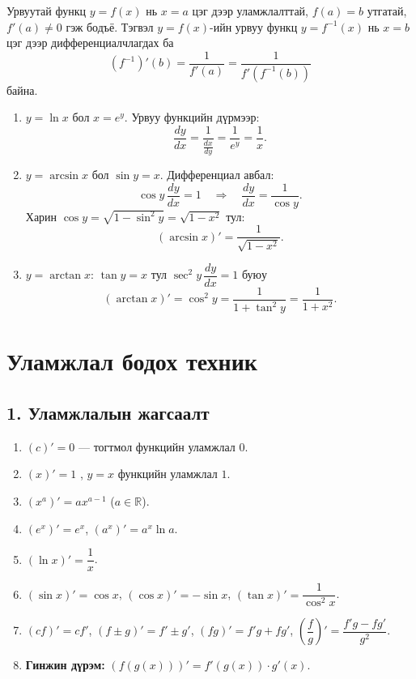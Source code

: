 \begin{theorem}
Урвуутай функц $y=f(x)$ нь $x=a$ цэг дээр уламжлалттай, $f(a)=b$ утгатай, $f'(a)\neq0$ гэж бодъё. Тэгвэл $y=f(x)$-ийн урвуу функц $y=f^{-1}(x)$ нь $x=b$ цэг дээр дифференциалчлагдах ба 
\[
\boxed{(f^{-1})'(b) = \dfrac{1}{f'(a)}=\dfrac{1}{f'(f^{-1}(b))}}
\] байна.
\end{theorem}
\begin{example}
\begin{enumerate}
  \item $y=\ln x$ бол $x=e^y$. Урвуу функцийн дүрмээр:
  \[
  \frac{dy}{dx} = \frac{1}{\frac{dx}{dy}} = \frac{1}{e^y} = \frac{1}{x}.
  \]
  \item $y=\arcsin x$ бол $\sin y = x$. Дифференциал авбал:
  \[
  \cos y \, \frac{dy}{dx} = 1
  \quad \Longrightarrow \quad
  \frac{dy}{dx} = \frac{1}{\cos y}.
  \]
  Харин $\cos y = \sqrt{1-\sin^2 y}=\sqrt{1-x^2}$ тул:
  \[
  (\arcsin x)' = \frac{1}{\sqrt{1-x^2}}.
  \]
  \item $y=\arctan x$: $\tan y = x$ тул $\sec^2 y\,\dfrac{dy}{dx}=1$ буюу
  \[
  (\arctan x)'=\cos^2 y=\frac{1}{1+\tan^2 y}=\frac{1}{1+x^2}.
  \]
\end{enumerate}
\end{example}
\newpage
\section{Уламжлал бодох техник}

\subsection*{1. Уламжлалын жагсаалт}
\begin{enumerate}
  \item $(c)'=0$ — тогтмол функцийн уламжлал $0$.
  \item $(x)'=1$ , $y=x$ функцийн уламжлал $1$.
  \item $(x^{a})'=ax^{a-1}$ \;($a\in\mathbb{R}$).
  \item $(e^x)'=e^x$, \; $(a^x)'=a^x\ln a$.
  \item $(\ln x)'=\dfrac{1}{x}$.
  \item $(\sin x)'=\cos x$, \; $(\cos x)'=-\sin x$, \; $(\tan x)'=\dfrac{1}{\cos^2 x}$.
  \item $(cf)'=cf'$, \; $(f\pm g)'=f'\pm g'$, \; $(fg)'=f'g+fg'$, \;
  $\displaystyle \left(\dfrac{f}{g}\right)'=\dfrac{f'g-fg'}{g^2}$.
  \item \textbf{Гинжин дүрэм:} $(f(g(x)))'=f'(g(x))\cdot g'(x)$.
\end{enumerate}


